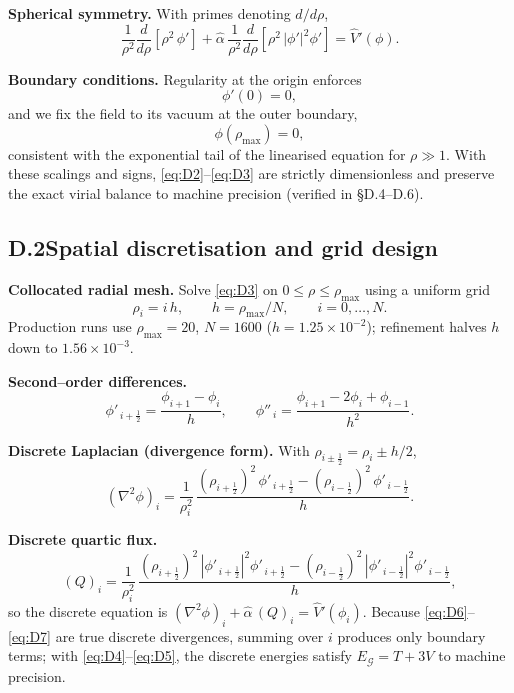 \documentclass{article}
\begin{document}
\textbf{Spherical symmetry.}
With primes denoting $d/d\rho$,
\begin{equation}
\frac{1}{\rho^2}\frac{d}{d\rho}\!\left[\rho^2\,\phi'\right]
+\hat{\alpha}\,\frac{1}{\rho^2}\frac{d}{d\rho}\!\left[\rho^2\,|\phi'|^2\phi'\right]
=\widehat{V}'(\phi).
\label{eq:D3}
\end{equation}

\textbf{Boundary conditions.}
Regularity at the origin enforces
\begin{equation}
\phi'(0)=0,
\label{eq:D4}
\end{equation}
and we fix the field to its vacuum at the outer boundary,
\begin{equation}
\phi(\rho_{\max})=0,
\label{eq:D5}
\end{equation}
consistent with the exponential tail of the linearised equation for $\rho\gg1$. With these scalings and signs, \eqref{eq:D2}–\eqref{eq:D3} are strictly dimensionless and preserve the exact virial balance to machine precision (verified in §D.4–D.6).

\subsection*{D.2\;\;Spatial discretisation and grid design}

\textbf{Collocated radial mesh.}
Solve \eqref{eq:D3} on $0\le\rho\le\rho_{\max}$ using a uniform grid
\[
\rho_i=i\,h,\qquad h=\rho_{\max}/N,\qquad i=0,\dots,N.
\]
Production runs use $\rho_{\max}=20$, $N=1600$ ($h=1.25\times10^{-2}$); refinement halves $h$ down to $1.56\times10^{-3}$.

\textbf{Second–order differences.}
\[
\phi'_{\,i+\frac12}=\frac{\phi_{i+1}-\phi_i}{h},\qquad
\phi''_{\,i}=\frac{\phi_{i+1}-2\phi_i+\phi_{i-1}}{h^2}.
\]

\textbf{Discrete Laplacian (divergence form).}
With $\rho_{i\pm\frac12}=\rho_i\pm h/2$,
\begin{equation}
(\nabla^2\phi)_i=\frac{1}{\rho_i^2}\,
\frac{(\rho_{i+\frac12})^2\,\phi'_{\,i+\frac12}-(\rho_{i-\frac12})^2\,\phi'_{\,i-\frac12}}{h}.
\label{eq:D6}
\end{equation}

\textbf{Discrete quartic flux.}
\begin{equation}
(Q)_i=\frac{1}{\rho_i^2}\,
\frac{(\rho_{i+\frac12})^2\,|\phi'_{\,i+\frac12}|^2\phi'_{\,i+\frac12}-(\rho_{i-\frac12})^2\,|\phi'_{\,i-\frac12}|^2\phi'_{\,i-\frac12}}{h},
\label{eq:D7}
\end{equation}
so the discrete equation is $(\nabla^2\phi)_i+\hat{\alpha}\,(Q)_i=\widehat{V}'(\phi_i)$. Because \eqref{eq:D6}–\eqref{eq:D7} are true discrete divergences, summing over $i$ produces only boundary terms; with \eqref{eq:D4}–\eqref{eq:D5}, the discrete energies satisfy $E_{\mathcal G}=T+3V$ to machine precision.
\end{document}
